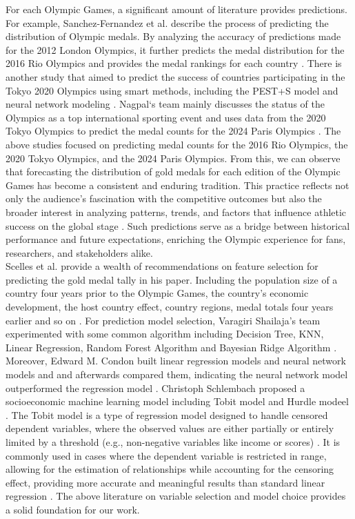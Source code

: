 \documentclass[12pt]{article}
\begin{document}
For each Olympic Games, a significant amount of literature provides predictions. For example, Sanchez-Fernandez et al. describe the process of predicting the distribution of Olympic medals. By analyzing the accuracy of predictions made for the 2012 London Olympics, it further predicts the medal distribution for the 2016 Rio Olympics and provides the medal rankings for each country \cite{sanchez2016olympic}. There is another study that aimed to predict the success of countries participating in the Tokyo 2020 Olympics using smart methods, including the PEST+S model and neural network modeling \cite{fazlollahi2020predicting}. Nagpal‘s team mainly discusses the status of the Olympics as a top international sporting event and uses data from the 2020 Tokyo Olympics to predict the medal counts for the 2024 Paris Olympics \cite{nagpal2023paris}. The above studies focused on predicting medal counts for the 2016 Rio Olympics, the 2020 Tokyo Olympics, and the 2024 Paris Olympics. From this, we can observe that forecasting the distribution of gold medals for each edition of the Olympic Games has become a consistent and enduring tradition. This practice reflects not only the audience’s fascination with the competitive outcomes but also the broader interest in analyzing patterns, trends, and factors that influence athletic success on the global stage \cite{grasso2015historical}. Such predictions serve as a bridge between historical performance and future expectations, enriching the Olympic experience for fans, researchers, and stakeholders alike.\\

Scelles et al. provide a wealth of recommendations on feature selection for predicting the gold medal tally in his paper. Including the population size of a country four years prior to the Olympic Games, the country's economic development, the host country effect, country regions, medal totals four years earlier and so on \cite{scelles2020forecasting}. For prediction model selection, Varagiri Shailaja's team experimented with some common algorithm including Decision Tree, KNN, Linear Regression, Random  Forest Algorithm and Bayesian Ridge Algorithm \cite{shailaja2020predictive}. Moreover, Edward M. Condon built linear regression models and neural network models and and afterwards compared them, indicating the neural network model outperformed the regression model \cite{CONDON19991243}. Christoph Schlembach proposed a socioeconomic machine learning model including Tobit model and Hurdle modeel \cite{SCHLEMBACH2022121314}. The Tobit model is a type of regression model designed to handle censored dependent variables, where the observed values are either partially or entirely limited by a threshold (e.g., non-negative variables like income or scores) \cite{amemiya1984tobit}. It is commonly used in cases where the dependent variable is restricted in range, allowing for the estimation of relationships while accounting for the censoring effect, providing more accurate and meaningful results than standard linear regression \cite{mcdonald1980uses}. The above literature on variable selection and model choice provides a solid foundation for our work.
\end{document}
